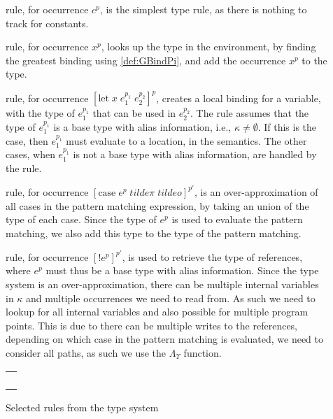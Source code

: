 \documentclass[../../master.tex]{subfiles}
\begin{document}
\begin{description}
	\item[] rule, for occurrence $c^p$, is the simplest type rule, as there is nothing to track for constants.

	\item[] rule, for occurrence $x^p$, looks up the type in the environment, by finding the greatest binding using \cref{def:GBindPi}, and add the occurrence $x^p$ to the type.

	\item[] rule, for occurrence $[\mbox{let}\;x\;e_1^{p_1}\;e_2^{p_2}]^p$, creates a local binding for a variable, with the type of $e_1^{p_1}$ that can be used in $e_2^{p_2}$.
		The  rule assumes that the type of $e_1^{p_1}$ is a base type with alias information, i.e., $\kappa\neq\emptyset$.
		If this is the case, then $e_1^{p_1}$ must evaluate to a location, in the semantics.
		The other cases, when $e_1^{p_1}$ is not a base type with alias information, are handled by the  rule.

	\item[] rule, for occurrence $[\mbox{case}\;e^{p}\;tilde{\pi}\;tilde{o}]^{p'}$, is an over-approximation of all cases in the pattern matching expression, by taking an union of the type of each case.
		Since the type of $e^p$ is used to evaluate the pattern matching, we also add this type to the type of the pattern matching.


	\item[] rule, for occurrence $[!e^{p}]^{p'}$, is used to retrieve the type of references, where $e^p$ must thus be a base type with alias information.
		Since the type system is an over-approximation, there can be multiple internal variables in $\kappa$ and multiple occurrences we need to read from.
		As such we need to lookup for all internal variables and also possible for multiple program points.
		This is due to there can be multiple writes to the references, depending on which case in the pattern matching is evaluated, we need to consider all paths, as such we use the $\Lambda_\Upsilon$ function.
\end{description}

\begin{figure}[H]
	\setlength\tabcolsep{8pt}
	\begin{tabular}{l}
		\\[0.7cm]
		\\[0.7cm]
		\\[0.7cm]
		\\[0.7cm]
		\\[0.7cm]
	\end{tabular}
	\caption{Selected rules from the type system}
	\label{fig:TypeSys}
\end{figure}
\end{document}
